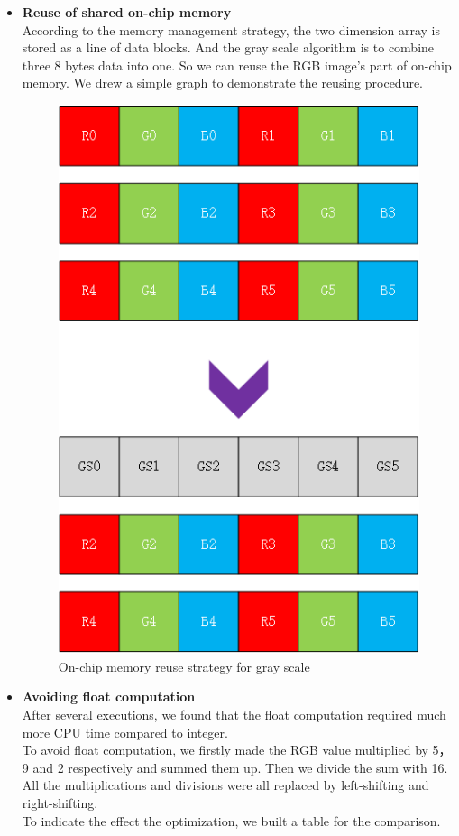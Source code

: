 \documentclass[conference]{IEEEtran}
\begin{document}
\begin{itemize}
	\item{\textbf{Reuse of shared on-chip memory}}\\
	According to the memory management strategy, the two dimension array is stored as a line of data blocks. And the gray scale algorithm is to combine three 8 bytes data into one. So we can reuse the RGB image's part of on-chip memory. We drew a simple graph to demonstrate the reusing procedure.
	\begin{figure}
		\centering
		\includegraphics[scale=0.5]{reuse.png}
		\caption{On-chip memory reuse strategy for gray scale}
		\label{fg:reuse}
	\end{figure}
	\item{\textbf{Avoiding float computation}}\\
	After several executions, we found that the float computation required much more CPU time compared to integer. \\
	To avoid float computation, we firstly made the RGB value multiplied by 5， 9 and 2 respectively and summed them up. Then we divide the sum with 16. All the multiplications and divisions were all replaced by left-shifting and right-shifting.\\
	To indicate the effect the optimization, we built a table for the comparison.
\end{itemize}
\end{document}
